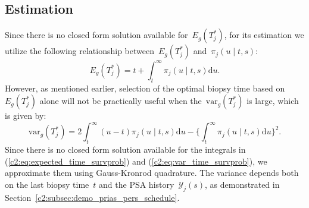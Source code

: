 \subsection{Estimation}
\label{c2:subsec:estimation}
Since there is no closed form solution available for~$E_g(T^*_j)$, for its estimation we utilize the following relationship between~$E_g(T^*_j)$ and~$\pi_j(u \mid t, s)$:
\begin{equation}
\label{c2:eq:expected_time_survprob}
E_g(T^*_j) = t + \int_t^\infty \pi_j(u \mid t, s) \mathrm{d} u.
\end{equation}
However, as mentioned earlier, selection of the optimal biopsy time based on~$E_g(T_j^*)$ alone will not be practically useful when the~$\mbox{var}_g(T^*_j)$ is large, which is given by:
\begin{equation}
\label{c2:eq:var_time_survprob}
\mbox{var}_g(T^*_j) = 2 \int_t^\infty {(u-t) \pi_j(u \mid t, s) \mathrm{d} u} - \Big\{\int_t^\infty \pi_j(u \mid t, s) \mathrm{d} u\Big\}^2.
\end{equation}
Since there is no closed form solution available for the integrals in (\ref{c2:eq:expected_time_survprob}) and (\ref{c2:eq:var_time_survprob}), we approximate them using Gauss-Kronrod quadrature. The variance depends both on the last biopsy time~$t$ and the PSA history~$\mathcal{Y}_j(s)$, as demonstrated in Section~\ref{c2:subsec:demo_prias_pers_schedule}.

